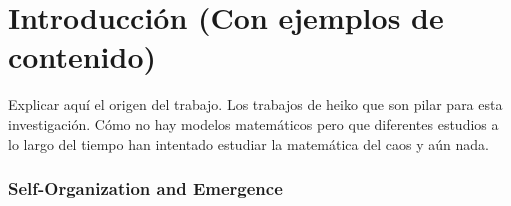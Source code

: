 
\chapter{Introducción (Con ejemplos de contenido)}
Explicar aquí el origen del trabajo. Los trabajos de heiko que son pilar para esta investigación. Cómo no hay modelos matemáticos pero que diferentes estudios a lo largo del tiempo han intentado estudiar la matemática del caos y aún nada.

\subsection{Self-Organization and Emergence}
